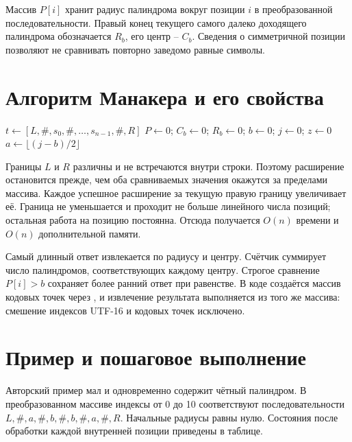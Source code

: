 Массив $P[i]$ хранит радиус палиндрома вокруг позиции $i$ в преобразованной последовательности. Правый конец текущего самого далеко доходящего палиндрома обозначается $R_b$, его центр -- $C_b$. Сведения о симметричной позиции позволяют не сравнивать повторно заведомо равные символы.

\section{Алгоритм Манакера и его свойства}
\begin{algorithm}[H]
\small\DontPrintSemicolon
\caption{Поиск самого длинного палиндрома и числа вхождений}
$t\gets [L,\#,s_0,\#,\ldots,s_{n-1},\#,R]$\;
$P\gets 0$; $C_b\gets0$; $R_b\gets0$; $b\gets0$; $j\gets0$; $z\gets0$\;
$a\gets\lfloor(j-b)/2\rfloor$\;
\end{algorithm}

Границы $L$ и $R$ различны и не встречаются внутри строки. Поэтому расширение остановится прежде, чем оба сравниваемых значения окажутся за пределами массива. Каждое успешное расширение за текущую правую границу увеличивает её. Граница не уменьшается и проходит не больше линейного числа позиций; остальная работа на позицию постоянна. Отсюда получается $O(n)$ времени и $O(n)$ дополнительной памяти.

Самый длинный ответ извлекается по радиусу и центру. Счётчик суммирует число палиндромов, соответствующих каждому центру. Строгое сравнение $P[i]>b$ сохраняет более ранний ответ при равенстве. В коде создаётся массив кодовых точек через , и извлечение результата выполняется из того же массива: смешение индексов UTF-16 и кодовых точек исключено.

\section{Пример и пошаговое выполнение}
Авторский пример  мал и одновременно содержит чётный палиндром. В преобразованном массиве индексы от 0 до 10 соответствуют последовательности $L,\#,a,\#,b,\#,b,\#,a,\#,R$. Начальные радиусы равны нулю. Состояния после обработки каждой внутренней позиции приведены в таблице.

